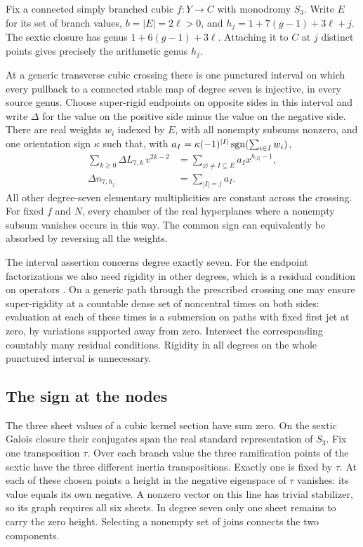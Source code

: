 Fix a connected simply branched cubic \(f:Y\to C\) with monodromy
\(S_3\). Write \(E\) for its set of branch values, \(b=|E|=2\ell>0\),
and \(h_j=1+7(g-1)+3\ell+j\). The sextic closure has genus
\(1+6(g-1)+3\ell\). Attaching it to \(C\) at \(j\) distinct points
gives precisely the arithmetic genus \(h_j\).

\begin{theorem}\label{p14-thm:wall}
At a generic transverse cubic crossing there is one punctured interval
on which every pullback to a connected stable map of degree seven is
injective, in every source genus. Choose super-rigid endpoints on
opposite sides in this interval and write \(\Delta\) for the value on
the positive side minus the value on the negative side. There are real
weights \(w_i\) indexed by \(E\), with all nonempty subsums nonzero, and
one orientation sign \(\kappa\) such that, with
\(a_I=\kappa(-1)^{|I|}\operatorname{sgn}(\sum_{i\in I} w_i)\),
\begin{align}
 \sum_{k\geq0}\Delta L_{7,k}\,v^{2k-2}
     &=\sum_{\varnothing\ne I\subseteq E}a_I x^{h_{|I|}-1},
            \label{p14-eq:main-series}\\
 \Delta n_{7,h_j}&=\sum_{|I|=j}a_I .\label{p14-eq:main-exponents}
\end{align}
All other degree-seven elementary multiplicities are constant across
the crossing. For fixed \(f\) and \(N\), every chamber of the real hyperplanes
where a nonempty subsum vanishes occurs in this way. The common sign can equivalently be absorbed
by reversing all the weights.
\end{theorem}

The interval assertion concerns degree exactly seven. For the endpoint
factorizations we also need rigidity in other degrees, which is a
residual condition on operators \cite{wendl,dwbn}. On a generic path
through the prescribed crossing one may ensure super-rigidity at a
countable dense set of noncentral times on both sides: evaluation at
each of these times is a submersion on paths with fixed first jet at
zero, by variations supported away from zero. Intersect the corresponding
countably many residual conditions. Rigidity in all degrees on the
whole punctured interval is unnecessary.


\subsection{The sign at the nodes}
The three sheet values of a cubic kernel section have sum zero. On
the sextic Galois closure their conjugates span the real standard
representation of \(S_3\). Fix one transposition \(\tau\). Over each branch value the three
ramification points of the sextic have the three different inertia
transpositions. Exactly one is fixed by \(\tau\). At each of these
chosen points a height in the negative eigenspace of \(\tau\) vanishes:
its value equals its own negative. A nonzero vector on this line has
trivial stabilizer, so its graph requires all six sheets. In
degree seven only one sheet remains to carry the zero height.
Selecting a nonempty set of joins connects the two components.

